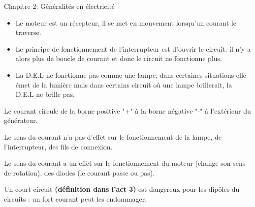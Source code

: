 \documentclass[24pt]{article}
\newcommand{\titre}{Chapitre 2: Généralités en électricité} %
\begin{document}
\thispagestyle{fancy}
\cfoot{}

\begin{titlebox}{\titre}
    \setlength\parindent{4pt} %
    \setlength\parskip{5pt} 

    \begin{itemize}
        \item Le moteur est un récepteur, il se met en mouvement lorsqu'un courant le traverse.
        \item Le principe de fonctionnement de 
        l'interrupteur est d'ouvrir le circuit: il n'y a alors plus de 
        boucle de courant et donc le circuit ne fonctionne plus.
        \item La D.E.L ne fonctionne pas comme une lampe, dans certaines situations 
        elle émet de la lumière mais dans certains circuit où une lampe brillerait, la D.E.L ne brille pas. 
    \end{itemize}
    
    
    \vspace{50pt}
    Le courant circule de la borne positive "+" 
    à la borne négative "-" à l'extérieur du générateur.

    Le sens du courant n'a pas d'effet sur le 
    fonctionnement de la lampe, de l'interrupteur, des fils de connexion.
    
    Le sens du courant a un effet sur le fonctionnement du moteur 
    (change son sens de rotation), des diodes (le
    courant passe ou pas).

    \begin{multicols}{2}
    [
    ]
    \hspace{-17pt}
    \begin{minipage}[t]{0.3\textwidth}
    \end{minipage}

    \begin{minipage}[t]{0.3\textwidth}
    \end{minipage}
    \end{multicols}
    
    \vspace{50pt}
    Un court circuit \textbf{\color{DarkRed} {(définition dans l'act 3)}} est dangereux
    pour les dipôles du circuits : un fort courant peut les endommager.
    

\end{titlebox}
\end{document}
